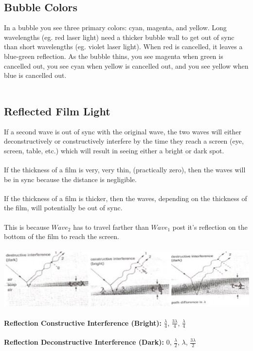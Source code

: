 \documentclass{article}
\begin{document}
\vspace{-1.5cm}

\subsection{Bubble Colors}
In a bubble you see three primary colors: cyan, magenta, and yellow. Long wavelengths (eg. red laser light) need a thicker bubble wall to get out of sync than short wavelengths (eg. violet laser light). When red is cancelled, it leaves a blue-green reflection. As the bubble thins, you see magenta when green is cancelled out, you see cyan when yellow is cancelled out, and you see yellow when blue is cancelled out.\\\\

\subsection{Reflected Film Light}
If a second wave is out of sync with the original wave, the two waves will either deconstructively or constructively interfere by the time they reach a screen (eye, screen, table, etc.) which will result in seeing either a bright or dark spot.\\\\
If the thickness of a film is very, very thin, (practically zero), then the waves will be in sync because the distance is negligible. \\\\
If the thickness of a film is thicker, then the waves, depending on the thickness of the film, will potentially be out of sync. \\\\
This is because $Wave_2$ has to travel farther than $Wave_1$ post it's reflection on the bottom of the film to reach the screen.\\\\
\includegraphics[scale=0.5]{images/reflected_films} \\\\
\noindent \textbf{Reflection Constructive Interference (Bright):} $\frac{\lambda}{4}$, $\frac{3\lambda}{4}$, $\frac{\lambda}{4}$ \\\\
\textbf{Reflection Deconstructive Interference (Dark):} $0$, $\frac{\lambda}{2}$, $\lambda$, $\frac{3\lambda}{2}$
\end{document}
